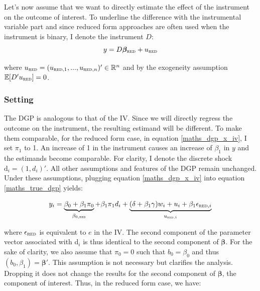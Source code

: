 \documentclass[a4paper, 11pt]{report}
\begin{document}
			Let's now assume that we want to directly estimate the effect of the instrument on the outcome of interest. To underline the difference with the instrumental variable part and since reduced form approaches are often used when the instrument is binary, I denote the instrument $D$:
						~
						\[
							y = D \bm{\beta_{\textsc{red}}} + u_{\textsc{red}}
						\]
					
					where $u_{\textsc{red}} = (u_{\textsc{red}, 1}, ... , u_{\textsc{red}, n})' \in \mathbb{R}^{n}$ and by the exogeneity assumption $\mathbb{E}[D'u_{\textsc{red}}] = 0$.
		
			\subsubsection{Setting}
			
			
				The DGP is analogous to that of the IV. Since we will directly regress the outcome on the instrument, the resulting estimand will be different. To make them comparable, for the reduced form case, in equation \ref{maths_dgp_x_iv}, I set $\pi_{1}$ to 1. An increase of 1 in the instrument causes an increase of $\beta_{1}$ in $y$ and the estimands become comparable. For clarity, I denote the discrete shock $\text{d}_{i} = (1, d_{i})'$. All other assumptions and features of the DGP remain unchanged. Under these assumptions, plugging equation \ref{maths_dgp_x_iv} into equation \ref{maths_true_dgp} yields:
				
				\[
					y_{i} = \underbrace{\beta_{0} + \beta_{1}\pi_0}_{\beta_{0, \textsc{red}}} + \beta_{1}\pi_{1}d_{i} + \underbrace{(\delta + \beta_{1}\gamma) w_{i} + u_{i} + \beta_{1}\epsilon_{\textsc{red}, i}}_{u_{\textsc{red}, i}}
				\]
				
				where $\epsilon_{\textsc{red}}$ is equivalent to $e$ in the IV. The second component of the parameter vector associated with d$_{i}$ is thus identical to the second component of $\bm{\beta}$. For the sake of clarity, we also assume that $\pi_{0} = 0$ such that $b_{0} = \beta_{0}$ and thus $(b_{0}, \beta_{1}) = \bm{\beta}'$. This assumption is not necessary but clarifies the analysis. Dropping it does not change the results for the second component of $\bm{\beta}$, the component of interest. %
				Thus, in the reduced form case, we have:
				
\end{document}
